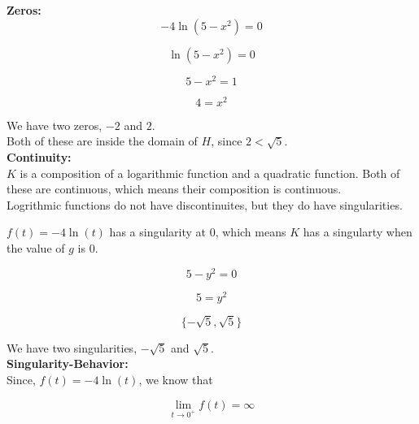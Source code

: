 \documentclass{ximera}
\begin{document}
\textbf{\textcolor{blue!55!black}{Zeros:}} \\




\[
-4 \ln(5 - x^2) = 0
\]


\[
 \ln(5 - x^2) = 0
\]


\[
5 - x^2 = 1
\]


\[
4 = x^2
\]


We have two zeros, $-2$ and $2$. \\

Both of these are inside the domain of $H$, since $2 < \sqrt{5}$. \\













\textbf{\textcolor{blue!55!black}{Continuity:}} \\


$K$ is a composition of a logarithmic function and a quadratic function.  Both of these are continuous, which means their composition is continuous. \\

Logrithmic functions do not have discontinuites, but they do have singularities.  


$f(t) = -4\ln(t)$ has a singularity at $0$, which means $K$ has a singularty when the value of $g$ is $0$.



\[
5 - y^2 = 0
\]



\[
5 = y^2
\]



\[
\{ -\sqrt{5}, \sqrt{5} \}
\]

We have two singularities, $-\sqrt{5}$ and $\sqrt{5}$. \\












\textbf{\textcolor{blue!55!black}{Singularity-Behavior:}} \\



Since, $f(t) = -4 \ln(t)$, we know that 


\[
\lim\limits_{t \to 0^+} f(t) = \infty
\]
\end{document}
